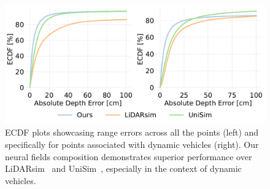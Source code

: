 \begin{figure}[t]
  \centering
   \includegraphics[width=0.8\columnwidth]{Figures/ecdf_3_methods.pdf}
   
        \caption{ECDF plots showcasing range errors across all the points (left) and specifically for points associated with dynamic vehicles (right). Our neural fields composition demonstrates superior performance over LiDARsim~\cite{manivasagam2020lidarsim} and UniSim~\cite{yang2023unisim}, especially in the context of dynamic vehicles.}
   \label{fig:ecdf}
   
\end{figure}